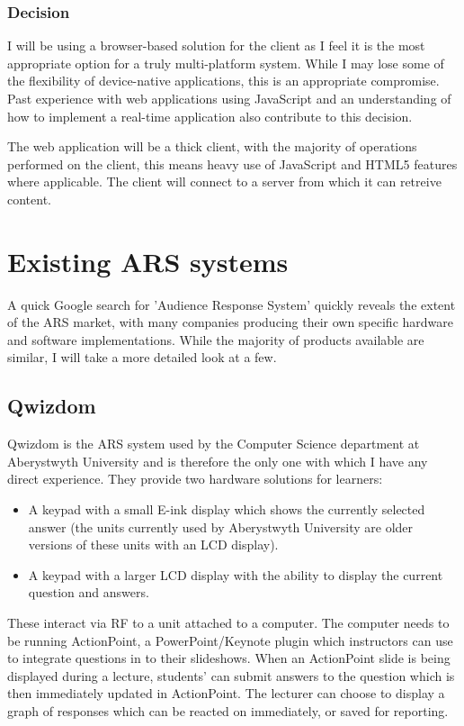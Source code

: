 \documentclass[a4papert,11pt,notitlepage]{article}
\begin{document}
\begin{appendices}
\subsubsection{Decision}
I will be using a browser-based solution for the client as I feel it is the most appropriate option for a truly multi-platform system. While I may lose some of the flexibility of device-native applications, this is an appropriate compromise. Past experience with web applications using JavaScript and an understanding of how to implement a real-time application also contribute to this decision.

The web application will be a thick client, with the majority of operations performed on the client, this means heavy use of JavaScript and HTML5 features where applicable. The client will connect to a server from which it can retreive content.

\pagebreak
\section{Existing ARS systems}
\label{app:existingars}
A quick Google search for 'Audience Response System' quickly reveals the extent of the ARS market, with many companies producing their own specific hardware and software implementations. While the majority of products available are similar, I will take a more detailed look at a few.

\subsection{Qwizdom}
Qwizdom\cite{qwizdom:web} is the ARS system used by the Computer Science department at Aberystwyth University and is therefore the only one with which I have any direct experience. They provide two hardware solutions for learners:
\begin{itemize}
\item A keypad with a small E-ink display which shows the currently selected answer (the units currently used by Aberystwyth University are older versions of these units with an LCD display).
\item A keypad with a larger LCD display with the ability to display the current question and answers.
\end{itemize}

These interact via RF to a unit attached to a computer. The computer needs to be running ActionPoint, a PowerPoint/Keynote plugin which instructors can use to integrate questions in to their slideshows. When an ActionPoint slide is being displayed during a lecture, students' can submit answers to the question which is then immediately updated in ActionPoint. The lecturer can choose to display a graph of responses which can be reacted on immediately, or saved for reporting.


\end{appendices}
\end{document}

